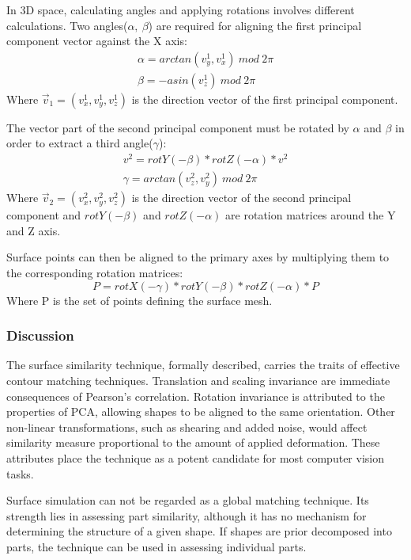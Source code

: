 \documentclass[
    floatsintext
]{article}
\begin{document}
In 3D space, calculating angles and applying rotations involves different calculations.
Two angles($\alpha,\ \beta$) are required for aligning the first principal component vector against the X axis: 
\begin{equation*}
  \begin{split}
    \alpha = arctan(v_y^1,v_x^1)\ mod\ 2\pi\\
    \beta = -asin(v_z^1)\ mod\ 2\pi
  \end{split}
\end{equation*}
Where $\vec{v}_1=(v_x^1,v_y^1,v_z^1)$ is the direction vector of the first principal component.

The vector part of the second principal component must be rotated by $\alpha$ and $\beta$ in order to extract a third angle($\gamma$): 
\begin{equation*}
  \begin{split}
    v^2 = rotY(-\beta) * rotZ(-\alpha) * v^2\\
    \gamma = arctan(v_z^2,v_y^2)\ mod\ 2\pi 
  \end{split}
\end{equation*}
Where $\vec{v}_2=(v_x^2,v_y^2,v_z^2)$ is the direction vector of the second principal component and $rotY(-\beta)$ and $rotZ(-\alpha)$ are rotation matrices around the Y and Z axis.   

Surface points can then be aligned to the primary axes by multiplying them to the corresponding rotation matrices:  
\begin{equation*}
   P = rotX(-\gamma) * rotY(-\beta) * rotZ(-\alpha) * P
\end{equation*}
Where P is the set of points defining the surface mesh.

\subsubsection{Discussion}
The surface similarity technique, formally described, carries the traits of effective contour matching techniques.
Translation and scaling invariance are immediate consequences of Pearson's correlation. 
Rotation invariance is attributed to the properties of PCA, allowing shapes to be aligned to the same orientation. 
Other non-linear transformations, such as shearing and added noise, would affect similarity measure proportional to the amount of applied deformation.    
These attributes place the technique as a potent candidate for most computer vision tasks.

Surface simulation can not be regarded as a global matching technique. 
Its strength lies in assessing part similarity, although it has no mechanism for determining the structure of a given shape.  
If shapes are prior decomposed into parts, the technique can be used in assessing individual parts. 
\end{document}

